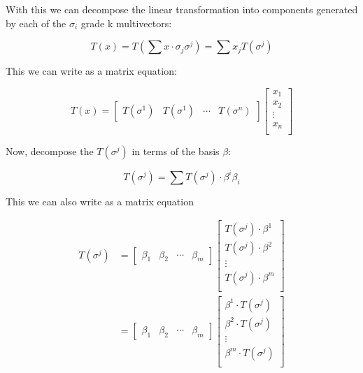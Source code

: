 With this we can decompose the linear transformation into components generated by each of the $\sigma_i$ grade k multivectors:

\begin{equation}
T(x) = T(\sum x \cdot \sigma_j \sigma^j) = \sum x_j T(\sigma^j)
\end{equation}

This we can write as a matrix equation:

\begin{equation}
T(x) = 
\begin{bmatrix}
T(\sigma^1) & T(\sigma^1) & \cdots & T(\sigma^n)
\end{bmatrix}
\begin{bmatrix}
x_1 \\
x_2 \\
\vdots \\
x_n \\
\end{bmatrix}
\end{equation}

Now, decompose the $T(\sigma^j)$ in terms of the basis $\beta$:

\begin{equation}
T(\sigma^j) = \sum T(\sigma^j) \cdot \beta^i \beta_i
\end{equation}

This we can also write as a matrix equation

\begin{equation}
\begin{aligned}
T(\sigma^j) &= 
\begin{bmatrix}
\beta_1 & \beta_2 & \cdots & \beta_m
\end{bmatrix}
\begin{bmatrix}
T(\sigma^j) \cdot \beta^1 \\
T(\sigma^j) \cdot \beta^2 \\
\vdots \\
T(\sigma^j) \cdot \beta^m \\
\end{bmatrix} \\
&=
\begin{bmatrix}
\beta_1 & \beta_2 & \cdots & \beta_m
\end{bmatrix}
\begin{bmatrix}
\beta^1 \cdot T(\sigma^j) \\
\beta^2 \cdot T(\sigma^j) \\
\vdots \\
\beta^m \cdot T(\sigma^j) \\
\end{bmatrix}
\end{aligned}
\end{equation}

